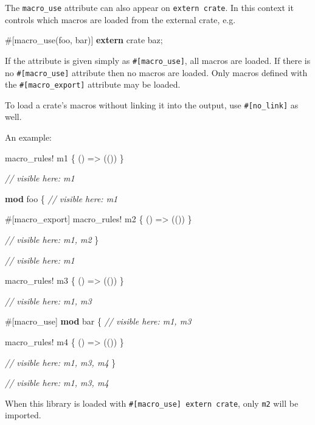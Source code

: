 \documentclass[a4paper,]{book}
\newenvironment{Shaded}{\begin{snugshade}}{\end{snugshade}}
\newcommand{\KeywordTok}[1]{\textcolor[rgb]{0.13,0.29,0.53}{\textbf{{#1}}}}
\newcommand{\CommentTok}[1]{\textcolor[rgb]{0.56,0.35,0.01}{\textit{{#1}}}}
\newcommand{\OtherTok}[1]{\textcolor[rgb]{0.56,0.35,0.01}{{#1}}}
\newcommand{\NormalTok}[1]{{#1}}
\begin{document}
The \texttt{macro\_use} attribute can also appear on
\texttt{extern\ crate}. In this context it controls which macros are
loaded from the external crate, e.g.

\begin{Shaded}
\begin{Highlighting}[]
\OtherTok{#[}\NormalTok{macro_use}\OtherTok{(}\NormalTok{foo}\OtherTok{,} \NormalTok{bar}\OtherTok{)]}
\KeywordTok{extern} \NormalTok{crate baz;}
\end{Highlighting}
\end{Shaded}

If the attribute is given simply as \texttt{\#{[}macro\_use{]}}, all
macros are loaded. If there is no \texttt{\#{[}macro\_use{]}} attribute
then no macros are loaded. Only macros defined with the
\texttt{\#{[}macro\_export{]}} attribute may be loaded.

To load a crate's macros without linking it into the output, use
\texttt{\#{[}no\_link{]}} as well.

An example:

\begin{Shaded}
\begin{Highlighting}[]
\OtherTok{macro_rules!} \NormalTok{m1 \{ () => (()) \}}

\CommentTok{// visible here: m1}

\KeywordTok{mod} \NormalTok{foo \{}
    \CommentTok{// visible here: m1}

    \OtherTok{#[}\NormalTok{macro_export}\OtherTok{]}
    \OtherTok{macro_rules!} \NormalTok{m2 \{ () => (()) \}}

    \CommentTok{// visible here: m1, m2}
\NormalTok{\}}

\CommentTok{// visible here: m1}

\OtherTok{macro_rules!} \NormalTok{m3 \{ () => (()) \}}

\CommentTok{// visible here: m1, m3}

\OtherTok{#[}\NormalTok{macro_use}\OtherTok{]}
\KeywordTok{mod} \NormalTok{bar \{}
    \CommentTok{// visible here: m1, m3}

    \OtherTok{macro_rules!} \NormalTok{m4 \{ () => (()) \}}

    \CommentTok{// visible here: m1, m3, m4}
\NormalTok{\}}

\CommentTok{// visible here: m1, m3, m4}
\end{Highlighting}
\end{Shaded}

When this library is loaded with
\texttt{\#{[}macro\_use{]}\ extern\ crate}, only \texttt{m2} will be
imported.
\end{document}
